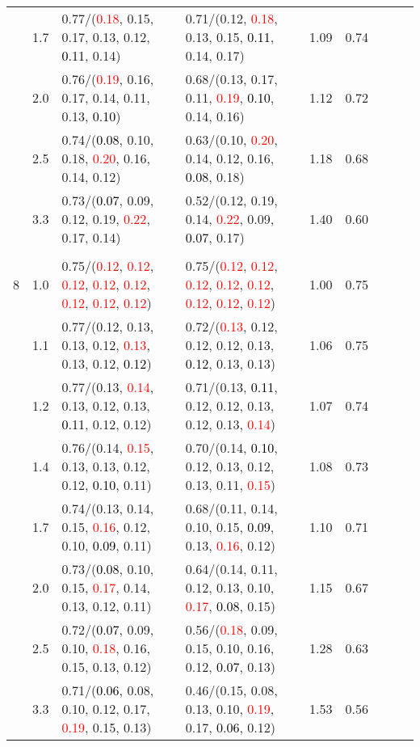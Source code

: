 \documentclass[10pt,a4paper]{report}
\begin{document}
\begin{table}[!htbp]
\begin{center}
{\begin{tabular}{ccllccccc}
			&1.7&0.77/(\textcolor{red}{0.18}, 0.15, 0.17, 0.13, 0.12, \textcolor{black}{0.11}, 0.14)&0.71/(0.12, \textcolor{red}{0.18}, 0.13, 0.15, \textcolor{black}{0.11}, 0.14, 0.17)&1.09&0.74\\
			&2.0&0.76/(\textcolor{red}{0.19}, 0.16, 0.17, 0.14, 0.11, 0.13, \textcolor{black}{0.10})&0.68/(0.13, 0.17, 0.11, \textcolor{red}{0.19}, \textcolor{black}{0.10}, 0.14, 0.16)&1.12&0.72\\
			&2.5&0.74/(\textcolor{black}{0.08}, 0.10, 0.18, \textcolor{red}{0.20}, 0.16, 0.14, 0.12)&0.63/(0.10, \textcolor{red}{0.20}, 0.14, 0.12, 0.16, \textcolor{black}{0.08}, 0.18)&1.18&0.68\\
			&3.3&0.73/(\textcolor{black}{0.07}, 0.09, 0.12, 0.19, \textcolor{red}{0.22}, 0.17, 0.14)&0.52/(0.12, 0.19, 0.14, \textcolor{red}{0.22}, 0.09, \textcolor{black}{0.07}, 0.17)&1.40&0.60\\
			&&&&\\
			8			&1.0&0.75/(\textcolor{red}{0.12}, \textcolor{red}{0.12}, \textcolor{red}{0.12}, \textcolor{red}{0.12}, \textcolor{red}{0.12}, \textcolor{red}{0.12}, \textcolor{red}{0.12}, \textcolor{red}{0.12})&0.75/(\textcolor{red}{0.12}, \textcolor{red}{0.12}, \textcolor{red}{0.12}, \textcolor{red}{0.12}, \textcolor{red}{0.12}, \textcolor{red}{0.12}, \textcolor{red}{0.12}, \textcolor{red}{0.12})&1.00&0.75\\
			&1.1&0.77/(0.12, 0.13, 0.13, 0.12, \textcolor{red}{0.13}, 0.13, 0.12, \textcolor{black}{0.12})&0.72/(\textcolor{red}{0.13}, 0.12, 0.12, 0.12, 0.13, \textcolor{black}{0.12}, 0.13, 0.13)&1.06&0.75\\
			&1.2&0.77/(0.13, \textcolor{red}{0.14}, 0.13, 0.12, 0.13, \textcolor{black}{0.11}, 0.12, 0.12)&0.71/(0.13, \textcolor{black}{0.11}, 0.12, 0.12, 0.13, 0.12, 0.13, \textcolor{red}{0.14})&1.07&0.74\\
			&1.4&0.76/(0.14, \textcolor{red}{0.15}, 0.13, 0.13, 0.12, 0.12, \textcolor{black}{0.10}, 0.11)&0.70/(0.14, \textcolor{black}{0.10}, 0.12, 0.13, 0.12, 0.13, 0.11, \textcolor{red}{0.15})&1.08&0.73\\
			&1.7&0.74/(0.13, 0.14, 0.15, \textcolor{red}{0.16}, 0.12, 0.10, \textcolor{black}{0.09}, 0.11)&0.68/(0.11, 0.14, 0.10, 0.15, \textcolor{black}{0.09}, 0.13, \textcolor{red}{0.16}, 0.12)&1.10&0.71\\
			&2.0&0.73/(\textcolor{black}{0.08}, 0.10, 0.15, \textcolor{red}{0.17}, 0.14, 0.13, 0.12, 0.11)&0.64/(0.14, 0.11, 0.12, 0.13, 0.10, \textcolor{red}{0.17}, \textcolor{black}{0.08}, 0.15)&1.15&0.67\\
			&2.5&0.72/(\textcolor{black}{0.07}, 0.09, 0.10, \textcolor{red}{0.18}, 0.16, 0.15, 0.13, 0.12)&0.56/(\textcolor{red}{0.18}, 0.09, 0.15, 0.10, 0.16, 0.12, \textcolor{black}{0.07}, 0.13)&1.28&0.63\\
			&3.3&0.71/(\textcolor{black}{0.06}, 0.08, 0.10, 0.12, 0.17, \textcolor{red}{0.19}, 0.15, 0.13)&0.46/(0.15, 0.08, 0.13, 0.10, \textcolor{red}{0.19}, 0.17, \textcolor{black}{0.06}, 0.12)&1.53&0.56\\
			\bottomrule
		\end{tabular}}
	\end{center}
\end{table}
\end{document}
